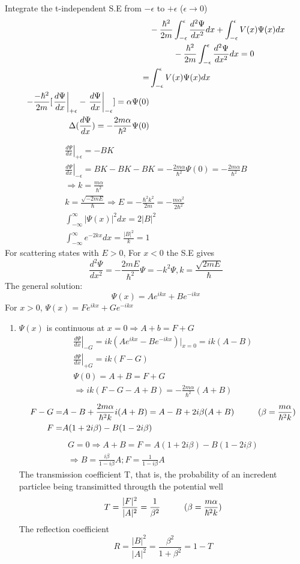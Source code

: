 \documentclass[12pt, a4paper]{article}
\newcommand{\tab}[1][1cm]{\hspace*{#1}}
\begin{document}
Integrate the t-independent S.E from $-\epsilon$ to $+\epsilon$ ($\epsilon \rightarrow 0$)
\begin{align*}
&-\frac{\hbar^2}{2m}\int_{-\epsilon}^{\epsilon}\frac{d^2\Psi}{dx^2}dx+\int_{-\epsilon}^{\epsilon}V(x)\Psi(x)dx\\
&\tab-\frac{\hbar^2}{2m}\int_{-\epsilon}^{\epsilon}\frac{d^2\Psi}{dx^2}dx = 0\\
=&\int_{-\epsilon}^{\epsilon}V(x)\Psi(x)dx\\
-\frac{-\hbar^2}{2m}[\left.\frac{d\Psi}{dx}\right\vert_{+\epsilon}-\left.\frac{d\Psi}{dx}\right\vert_{-\epsilon}]=\alpha\Psi(0)\\
\Delta(\frac{d\Psi}{dx})=-\frac{2m\alpha}{\hbar^2}\Psi(0)
\end{align*}

\begin{align*}
\left.\frac{d\Psi}{dx}\right\vert_{+\epsilon}=-BK\\
\left.\frac{d\Psi}{dx}\right\vert_{-\epsilon}=BK
-BK-BK=-\frac{2m\alpha}{\hbar^2}\Psi(0)=-\frac{2m\alpha}{\hbar^2}B\\
\Rightarrow k = \frac{m\alpha}{\hbar^2}\\
k=\frac{\sqrt{-2mE}}{\hbar}\Rightarrow E = -\frac{\hbar^2 k^2}{2m} = -\frac{m\alpha^2}{2\hbar^2}\\
\int_{-\infty}^{\infty}|\Psi(x)|^2dx=2|B|^2\\
\int_{-\infty}^{\infty}e^{-2kx}dx = \frac{|B|^2}{k}=1
\end{align*}
For scattering states with $E>0$, For $x<0$ the S.E gives
$$\frac{d^2\Psi}{dx^2}=-\frac{2mE}{\hbar^2}\Psi=-k^2\Psi,k=\frac{\sqrt{2mE}}{\hbar}$$
The general solution:
$$\Psi(x) = Ae^{ikx}+Be^{-ikx}$$
For $x>0$, $\Psi(x)=Fe^{ikx}+Ge^{-ikx}$
\begin{enumerate}
\item $\Psi(x)$ is continuous at $x=0\Rightarrow A+b=F+G$
\begin{align*}
\left.\frac{d\Psi}{dx}\right\vert_{-G}=ik(Ae^{ikx}-Be^{-ikx})\vert_{x=0}=ik(A-B)\\
\left.\frac{d\Psi}{dx}\right\vert_{+G}=ik(F-G)\\
\Psi(0)=A+B=F+G\\
\Rightarrow ik(F-G-A+B)=-\frac{2m\alpha}{\hbar^2}(A+B)
\end{align*}
\begin{align*}
F-G=&A-B+\frac{2m\alpha}{\hbar^2k}i(A+B)=A-B+2i\beta(A+B)\tab (\beta = \frac{m\alpha}{\hbar^2 k})\\
F=&A(1+2i\beta)-B(1-2i\beta)
\end{align*}
\begin{align*}
G=0\Rightarrow A+B=F=A(1+2i\beta)-B(1-2i\beta)\\
\Rightarrow B=\frac{i\beta}{1-i\beta}A; F=\frac{1}{1-i\beta}A
\end{align*}
The transmission coefficient T, that is, the probability of an incredent particlee being transimitted througth the potential well 
$$T=\frac{|F|^2}{|A|^2}=\frac{1}{\beta^2}\tab (\beta = \frac{m\alpha}{\hbar^2 k})$$
The reflection coefficient $$R=\frac{|B|^2}{|A|^2}=\frac{\beta^2}{1+\beta^2}=1-T$$
\end{enumerate}
\end{document}
